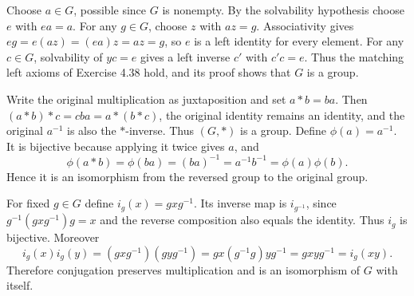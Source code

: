 
Choose $a\in G$, possible since $G$ is nonempty. By the solvability hypothesis choose $e$ with $ea=a$. For any $g\in G$, choose $z$ with $az=g$. Associativity gives $eg=e(az)=(ea)z=az=g$, so $e$ is a left identity for every element. For any $c\in G$, solvability of $yc=e$ gives a left inverse $c'$ with $c'c=e$. Thus the matching left axioms of Exercise 4.38 hold, and its proof shows that $G$ is a group.


Write the original multiplication as juxtaposition and set $a*b=ba$. Then $(a*b)*c=cba=a*(b*c)$, the original identity remains an identity, and the original $a^{-1}$ is also the $*$-inverse. Thus $(G,*)$ is a group. Define $\phi(a)=a^{-1}$. It is bijective because applying it twice gives $a$, and
\[\phi(a*b)=\phi(ba)=(ba)^{-1}=a^{-1}b^{-1}=\phi(a)\phi(b).
\]
Hence it is an isomorphism from the reversed group to the original group.


For fixed $g\in G$ define $i_g(x)=gxg^{-1}$. Its inverse map is $i_{g^{-1}}$, since $g^{-1}(gxg^{-1})g=x$ and the reverse composition also equals the identity. Thus $i_g$ is bijective. Moreover
\[i_g(x)i_g(y)=(gxg^{-1})(gyg^{-1})=gx(g^{-1}g)yg^{-1}=gxyg^{-1}=i_g(xy).
\]
Therefore conjugation preserves multiplication and is an isomorphism of $G$ with itself.
